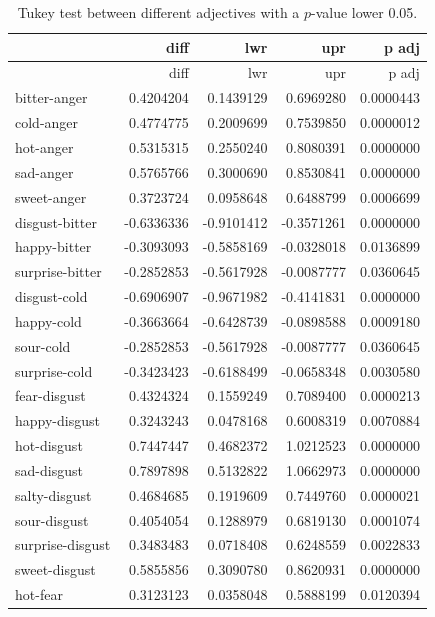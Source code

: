 \documentclass[
  letterpaper,
  DIV=11,
  numbers=noendperiod]{scrartcl}
\begin{document}
\begin{longtable}[]{@{}lrrrr@{}}
\caption{Tukey test between different adjectives with a \(p\)-value
lower 0.05.}\tabularnewline
\toprule\noalign{}
& diff & lwr & upr & p adj \\
\midrule\noalign{}
\endfirsthead
\toprule\noalign{}
& diff & lwr & upr & p adj \\
\midrule\noalign{}
\endhead
\bottomrule\noalign{}
\endlastfoot
bitter-anger & 0.4204204 & 0.1439129 & 0.6969280 & 0.0000443 \\
cold-anger & 0.4774775 & 0.2009699 & 0.7539850 & 0.0000012 \\
hot-anger & 0.5315315 & 0.2550240 & 0.8080391 & 0.0000000 \\
sad-anger & 0.5765766 & 0.3000690 & 0.8530841 & 0.0000000 \\
sweet-anger & 0.3723724 & 0.0958648 & 0.6488799 & 0.0006699 \\
disgust-bitter & -0.6336336 & -0.9101412 & -0.3571261 & 0.0000000 \\
happy-bitter & -0.3093093 & -0.5858169 & -0.0328018 & 0.0136899 \\
surprise-bitter & -0.2852853 & -0.5617928 & -0.0087777 & 0.0360645 \\
disgust-cold & -0.6906907 & -0.9671982 & -0.4141831 & 0.0000000 \\
happy-cold & -0.3663664 & -0.6428739 & -0.0898588 & 0.0009180 \\
sour-cold & -0.2852853 & -0.5617928 & -0.0087777 & 0.0360645 \\
surprise-cold & -0.3423423 & -0.6188499 & -0.0658348 & 0.0030580 \\
fear-disgust & 0.4324324 & 0.1559249 & 0.7089400 & 0.0000213 \\
happy-disgust & 0.3243243 & 0.0478168 & 0.6008319 & 0.0070884 \\
hot-disgust & 0.7447447 & 0.4682372 & 1.0212523 & 0.0000000 \\
sad-disgust & 0.7897898 & 0.5132822 & 1.0662973 & 0.0000000 \\
salty-disgust & 0.4684685 & 0.1919609 & 0.7449760 & 0.0000021 \\
sour-disgust & 0.4054054 & 0.1288979 & 0.6819130 & 0.0001074 \\
surprise-disgust & 0.3483483 & 0.0718408 & 0.6248559 & 0.0022833 \\
sweet-disgust & 0.5855856 & 0.3090780 & 0.8620931 & 0.0000000 \\
hot-fear & 0.3123123 & 0.0358048 & 0.5888199 & 0.0120394 \\

\end{longtable}
\end{document}
